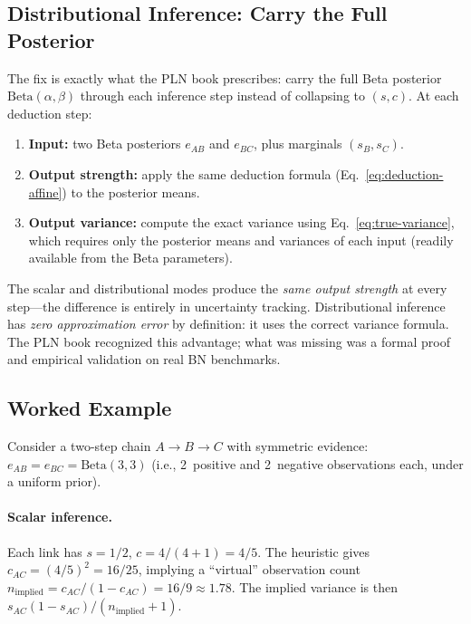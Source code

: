 \documentclass[11pt,openany]{report}
\begin{document}
\subsection*{Distributional Inference: Carry the Full Posterior}

The fix is exactly what the PLN book prescribes: carry the full Beta
posterior $\mathrm{Beta}(\alpha, \beta)$ through each inference step instead
of collapsing to $(s, c)$.  At each deduction step:

\begin{enumerate}
\item \textbf{Input:} two Beta posteriors $e_{AB}$ and $e_{BC}$, plus
  marginals $(s_B, s_C)$.
\item \textbf{Output strength:} apply the same deduction formula
  (Eq.~\ref{eq:deduction-affine}) to the posterior means.
\item \textbf{Output variance:} compute the exact variance using
  Eq.~\ref{eq:true-variance}, which requires only the posterior means
  and variances of each input (readily available from the Beta
  parameters).
\end{enumerate}

The scalar and distributional modes produce the \emph{same output strength}
at every step---the difference is entirely in uncertainty tracking.
Distributional inference has \emph{zero approximation error} by definition:
it uses the correct variance formula.  The PLN book recognized this
advantage; what was missing was a formal proof and empirical validation
on real BN benchmarks.

\subsection*{Worked Example}

Consider a two-step chain $A \to B \to C$ with symmetric evidence:
$e_{AB} = e_{BC} = \mathrm{Beta}(3, 3)$ (i.e., 2~positive and 2~negative
observations each, under a uniform prior).

\paragraph{Scalar inference.}  Each link has $s = 1/2$, $c = 4/(4+1) = 4/5$.
The heuristic gives $c_{AC} = (4/5)^2 = 16/25$, implying a
``virtual'' observation count $n_{\mathrm{implied}} = c_{AC}/(1 - c_{AC})
= 16/9 \approx 1.78$.  The implied variance is then
$s_{AC}(1 - s_{AC}) / (n_{\mathrm{implied}} + 1)$.
\end{document}

